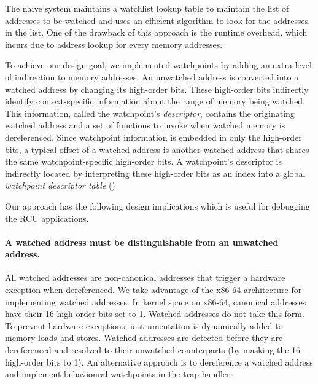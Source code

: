The naive system maintains a watchlist lookup table to maintain the list of addresses to be watched and uses an efficient algorithm to look for the addresses in the list. One of the drawback of this approach is the runtime overhead, which incurs due to address lookup for every memory addresses.  

To achieve our design goal, we implemented watchpoints by adding an extra level of indirection to memory addresses. An unwatched address is converted into a watched address by changing its high-order bits. These high-order bits indirectly identify context-specific information about the range of memory being watched. This information, called the watchpoint's \emph{descriptor}, contains the originating watched address and a set of functions to invoke when watched memory is dereferenced. Since watchpoint information is embedded in only the high-order bits, a typical offset of a watched address is another watched address that shares the same watchpoint-specific high-order bits. A watchpoint's descriptor is indirectly located by interpreting these high-order bits as an index into a global \emph{watchpoint descriptor table} ()

Our approach has the following design implications which is useful for debugging the RCU applications.



\paragraph{A watched address must be distinguishable from an unwatched address.} All watched addresses are non-canonical addresses that trigger a hardware exception when dereferenced. We take advantage of the x86-64 architecture for implementing watched addresses. In kernel space on x86-64, canonical addresses have their 16 high-order bits set to 1. Watched addresses do not take this form. To prevent hardware exceptions, instrumentation is dynamically added to memory loads and stores. Watched addresses are detected before they are dereferenced and resolved to their unwatched counterparts (by masking the 16 high-order bits to 1). An alternative approach is to dereference a watched address and implement behavioural watchpoints in the trap handler.
	
